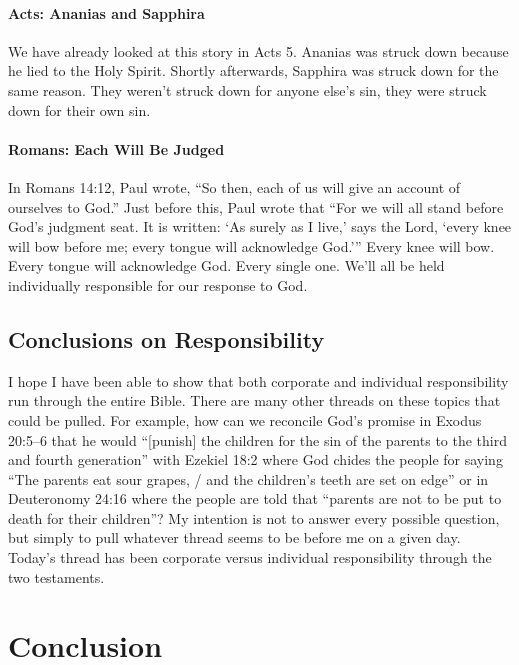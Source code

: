 \paragraph{Acts: Ananias and Sapphira} We have already looked at this story in
Acts 5. Ananias was struck down because he lied to the Holy Spirit. Shortly
afterwards, Sapphira was struck down for the same reason. They weren't struck
down for anyone else's sin, they were struck down for their own sin.

\paragraph{Romans: Each Will Be Judged} In Romans 14:12, Paul wrote, \enquote{So
then, each of us will give an account of ourselves to God.} Just before this,
Paul wrote that \enquote{For we will all stand before God's judgment seat. It is
written: \enquote{As surely as I live,} says the Lord, \enquote{every knee will
bow before me; every tongue will acknowledge God.}} Every knee will bow. Every
tongue will acknowledge God. Every single one. We'll all be held individually
responsible for our response to God.

\subsection{Conclusions on Responsibility}

I hope I have been able to show that both corporate and individual
responsibility run through the entire Bible. There are many other threads on
these topics that could be pulled. For example, how can we reconcile God's
promise in Exodus 20:5--6 that he would \enquote{[punish] the children for the
sin of the parents to the third and fourth generation} with Ezekiel 18:2 where
God chides the people for saying \enquote{The parents eat sour grapes, / and the
children's teeth are set on edge} or in Deuteronomy 24:16 where the people are
told that \enquote{parents are not to be put to death for their children}? My
intention is not to answer every possible question, but simply to pull whatever
thread seems to be before me on a given day. Today's thread has been corporate
versus individual responsibility through the two testaments.



\section{Conclusion}

